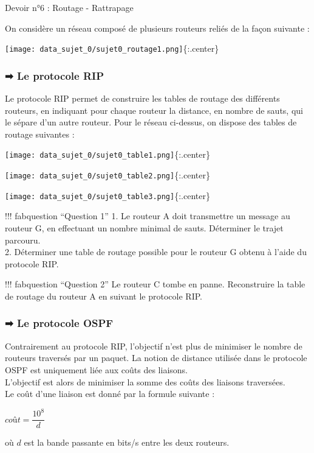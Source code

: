 \documentclass[
  12pt,
]{article}
\author{}
\date{}
\begin{document}
Devoir n°6 : Routage - Rattrapage

On considère un réseau composé de plusieurs routeurs reliés de la façon
suivante :

\texttt{[image: data\_sujet\_0/sujet0\_routage1.png]}\{:.center\}

\hypertarget{le-protocole-rip}{%
\subsubsection{➡ Le protocole RIP}\label{le-protocole-rip}}

Le protocole RIP permet de construire les tables de routage des
différents routeurs, en indiquant pour chaque routeur la distance, en
nombre de sauts, qui le sépare d'un autre routeur. Pour le réseau
ci-dessus, on dispose des tables de routage suivantes :

\texttt{[image: data\_sujet\_0/sujet0\_table1.png]}\{:.center\}

\texttt{[image: data\_sujet\_0/sujet0\_table2.png]}\{:.center\}

\texttt{[image: data\_sujet\_0/sujet0\_table3.png]}\{:.center\}

!!! fabquestion ``Question 1'' 1. Le routeur A doit transmettre un
message au routeur G, en effectuant un nombre minimal de sauts.
Déterminer le trajet parcouru.\\
2. Déterminer une table de routage possible pour le routeur G obtenu à
l'aide du protocole RIP.

!!! fabquestion ``Question 2'' Le routeur C tombe en panne. Reconstruire
la table de routage du routeur A en suivant le protocole RIP.

\hypertarget{le-protocole-ospf}{%
\subsubsection{➡ Le protocole OSPF}\label{le-protocole-ospf}}

Contrairement au protocole RIP, l'objectif n'est plus de minimiser le
nombre de routeurs traversés par un paquet. La notion de distance
utilisée dans le protocole OSPF est uniquement liée aux coûts des
liaisons.\\
L'objectif est alors de minimiser la somme des coûts des liaisons
traversées.\\
Le coût d'une liaison est donné par la formule suivante :

\(coût = \dfrac{10^8}{d}\)

où \(d\) est la bande passante en bits/s entre les deux routeurs.
\end{document}

